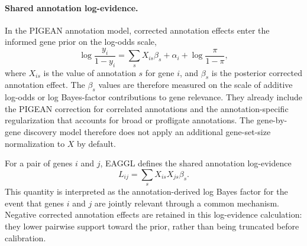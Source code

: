 \documentclass[11pt]{article}
\begin{document}
\paragraph{Shared annotation log-evidence.}
In the PIGEAN annotation model, corrected annotation effects enter the informed gene
prior on the log-odds scale,
\begin{equation}
\log\frac{y_i}{1-y_i}
= \sum_s X_{is}\beta_s + \alpha_i + \log\frac{\pi}{1-\pi},
\label{eq:eaggl_gene_gene_pigean_prior}
\end{equation}
where $X_{is}$ is the value of annotation $s$ for gene $i$, and $\beta_s$ is the
posterior corrected annotation effect. The $\beta_s$ values are therefore measured on
the scale of additive log-odds or log Bayes-factor contributions to gene relevance.
They already include the PIGEAN correction for correlated annotations and the
annotation-specific regularization that accounts for broad or profligate annotations.
The gene-by-gene discovery model therefore does not apply an additional gene-set-size
normalization to $X$ by default.

For a pair of genes $i$ and $j$, EAGGL defines the shared annotation log-evidence
\begin{equation}
L_{ij}
= \sum_s X_{is} X_{js} \beta_s.
\label{eq:eaggl_gene_gene_shared_logbf}
\end{equation}
This quantity is interpreted as the annotation-derived log Bayes factor for the event
that genes $i$ and $j$ are jointly relevant through a common mechanism. Negative
corrected annotation effects are retained in this log-evidence calculation: they lower
pairwise support toward the prior, rather than being truncated before calibration.
\end{document}
